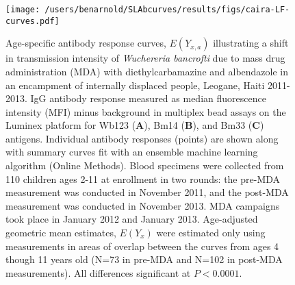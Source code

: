 \documentclass[11pt]{article}
\begin{document}
\clearpage
\begin{figure}[htbp]
\begin{center}
\texttt{[image: /users/benarnold/SLAbcurves/results/figs/caira-LF-curves.pdf]}
\begin{minipage}{\textwidth}
\caption{Age-specific antibody response curves, $E(Y_{x,a})$ illustrating a shift in transmission intensity of \textit{Wuchereria bancrofti} due to mass drug administration (MDA) with diethylcarbamazine and albendazole in an encampment of internally displaced people, Leogane, Haiti 2011-2013.  IgG antibody response measured as median fluorescence intensity (MFI) minus background in multiplex bead assays on the Luminex platform for Wb123 (\textbf{A}), Bm14 (\textbf{B}), and Bm33 (\textbf{C}) antigens. Individual antibody responses (points) are shown along with summary curves fit with an ensemble machine learning algorithm (Online Methods). Blood specimens were collected from 110 children ages 2-11 at enrollment in two rounds: the pre-MDA measurement was conducted in November 2011, and the post-MDA measurement was conducted in November 2013.  MDA campaigns took place in January 2012 and January 2013. Age-adjusted geometric mean estimates, $E(Y_x)$ were estimated only using measurements in areas of overlap between the curves from ages 4 though 11 years old (N=73 in pre-MDA and N=102 in post-MDA measurements). All differences significant at $P<0.0001$.}
\label{fig:cairaS2}
\end{minipage}
\end{center}
\end{figure}
\end{document}
